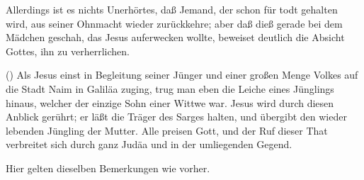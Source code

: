 Allerdings ist es nichts Unerhörtes, daß Jemand, der schon für todt gehalten wird, aus seiner Ohnmacht wieder zurückkehre; aber daß dieß gerade bei dem Mädchen geschah, das Jesus auferwecken wollte, beweiset deutlich die Absicht Gottes, ihn zu verherrlichen.
\begin{aufza}\setcounter{enumi}{5}
\item {} () Als Jesus einst in Begleitung seiner Jünger und einer großen Menge Volkes auf die Stadt Naim in Galiläa zuging, trug man eben die Leiche eines Jünglings hinaus, welcher der einzige Sohn einer Wittwe war. Jesus wird durch diesen Anblick gerührt; er läßt die Träger des Sarges halten, und übergibt den wieder lebenden Jüngling der Mutter. Alle preisen Gott, und der Ruf dieser That verbreitet sich durch ganz Judäa und in der umliegenden Gegend.
\end{aufza}\par
Hier gelten dieselben Bemerkungen wie vorher.
